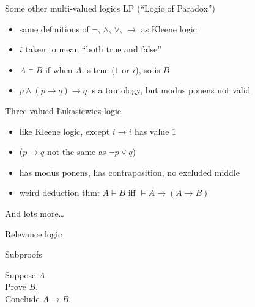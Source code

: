 \documentclass{beamer}
\newcommand{\sect}[1]{\begin{frame}\centerline{\large #1}\end{frame}}
\begin{document}
\begin{frame}{Some other multi-valued logics}
LP (``Logic of Paradox'')
\begin{itemize}
\item same definitions of $\lnot$, $\land$, $\lor$, $\to$ as Kleene logic
\item $i$ taken to mean ``both true and false''
\item $A\vDash B$ if when $A$ is true ($1$ or $i$), so is $B$
\item $p\land (p\to q)\to q$ is a tautology, but modus ponens not valid
\end{itemize}

\vfill

Three-valued \L ukasiewicz logic
\begin{itemize}
\item like Kleene logic, except $i\to i$ has value $1$
\item ($p\to q$ not the same as $\lnot p\lor q$)
\item has modus ponens, has contraposition, no excluded middle
\item weird deduction thm: $A\vDash B$ iff $\vDash A\to(A\to B)$
\end{itemize}

\vfill

And lots more\dots

\vfill

\end{frame}

\sect{Relevance logic}

\begin{frame}{Subproofs}

\begin{minipage}{.45\textwidth}
\end{minipage}
\hfill
\begin{minipage}{.35\textwidth}
Suppose $A$.\\
Prove $B$.\\
Conclude $A\to B$.
\end{minipage}

\end{frame}
\end{document}
